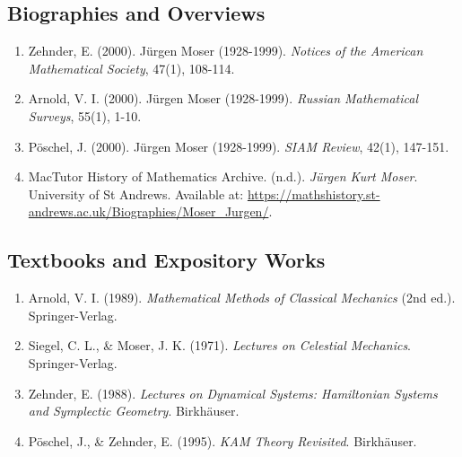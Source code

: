 \subsection*{Biographies and Overviews}
\begin{enumerate}
    \item Zehnder, E. (2000). Jürgen Moser (1928-1999). \textit{Notices of the American Mathematical Society}, 47(1), 108-114.
    \item Arnold, V. I. (2000). Jürgen Moser (1928-1999). \textit{Russian Mathematical Surveys}, 55(1), 1-10.
    \item Pöschel, J. (2000). Jürgen Moser (1928-1999). \textit{SIAM Review}, 42(1), 147-151.
    \item MacTutor History of Mathematics Archive. (n.d.). \textit{Jürgen Kurt Moser}. University of St Andrews. Available at: \url{https://mathshistory.st-andrews.ac.uk/Biographies/Moser_Jurgen/}.
\end{enumerate}

\subsection*{Textbooks and Expository Works}
\begin{enumerate}
    \item Arnold, V. I. (1989). \textit{Mathematical Methods of Classical Mechanics} (2nd ed.). Springer-Verlag.
    \item Siegel, C. L., \& Moser, J. K. (1971). \textit{Lectures on Celestial Mechanics}. Springer-Verlag.
    \item Zehnder, E. (1988). \textit{Lectures on Dynamical Systems: Hamiltonian Systems and Symplectic Geometry}. Birkhäuser.
    \item Pöschel, J., \& Zehnder, E. (1995). \textit{KAM Theory Revisited}. Birkhäuser.
\end{enumerate}
